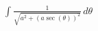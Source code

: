 \documentclass[preview]{standalone}
\begin{document}
\begin{align*}
\int \frac{1}{\sqrt{a^2+(a \sec(\theta))^2}} \, d\theta
\end{align*}
\end{document}
